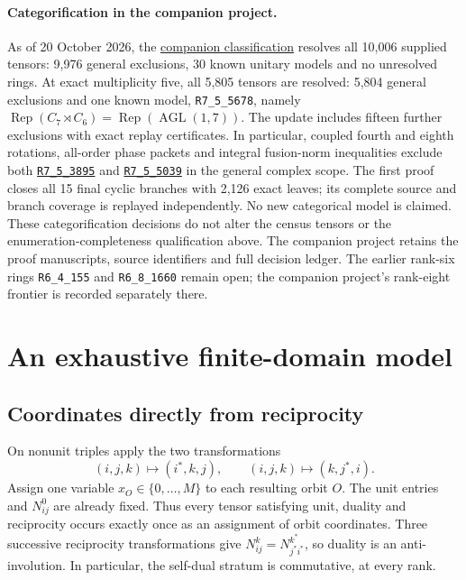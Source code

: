 \documentclass[11pt,a4paper]{article}
\theoremstyle{definition}\newtheorem{definition}[theorem]{Definition}\newtheorem{remark}[theorem]{Remark}
\begin{document}
\paragraph{Categorification in the companion project.}
As of 20 October 2026, the
\href{https://github.com/sebastienpalcoux/grothendieck-ring-classification}{companion classification}
resolves all 10,006 supplied tensors: 9,976 general exclusions, 30 known unitary
models and no unresolved rings. At exact multiplicity five, all 5,805 tensors
are resolved: 5,804 general exclusions and one known model,
\texttt{R7\_5\_5678}, namely
$\operatorname{Rep}(C_7\rtimes C_6)=\operatorname{Rep}(\operatorname{AGL}(1,7))$.
The update includes fifteen further exclusions with exact replay certificates.
In particular, coupled fourth and eighth rotations, all-order phase packets
and integral fusion-norm inequalities exclude both
\href{https://github.com/sebastienpalcoux/grothendieck-ring-classification/blob/main/evidence/rank7_m5_20261020/models/sqrt5/R3895_CYCLIC_CHAIN.md}{\texttt{R7\_5\_3895}} and
\href{https://github.com/sebastienpalcoux/grothendieck-ring-classification/blob/main/evidence/rank7_m5_20261020/models/sqrt5/R5039_CYCLIC_CHAIN.md}{\texttt{R7\_5\_5039}}
in the general complex scope. The first proof closes all 15 final cyclic
branches with 2,126 exact leaves; its complete source and branch coverage is
replayed independently. No new categorical model is claimed.
These categorification decisions do not alter the census tensors or the
enumeration-completeness qualification above. The companion project retains
the proof manuscripts, source identifiers and full decision ledger. The earlier
rank-six rings \texttt{R6\_4\_155} and \texttt{R6\_8\_1660} remain open;
the companion project's rank-eight frontier is recorded separately there.

\section{An exhaustive finite-domain model}
\subsection{Coordinates directly from reciprocity}
On nonunit triples apply the two transformations
\[
(i,j,k)\longmapsto(i^*,k,j),\qquad
(i,j,k)\longmapsto(k,j^*,i).
\]
Assign one variable $x_O\in\{0,\ldots,M\}$ to each resulting orbit $O$.
The unit entries and $N_{ij}^0$ are already fixed. Thus every tensor satisfying
unit, duality and reciprocity occurs exactly once as an assignment of orbit
coordinates. Three successive reciprocity transformations give
$N_{ij}^{k}=N_{j^*i^*}^{k^*}$, so duality is an anti-involution. In particular,
the self-dual stratum is commutative, at every rank.
\end{document}
